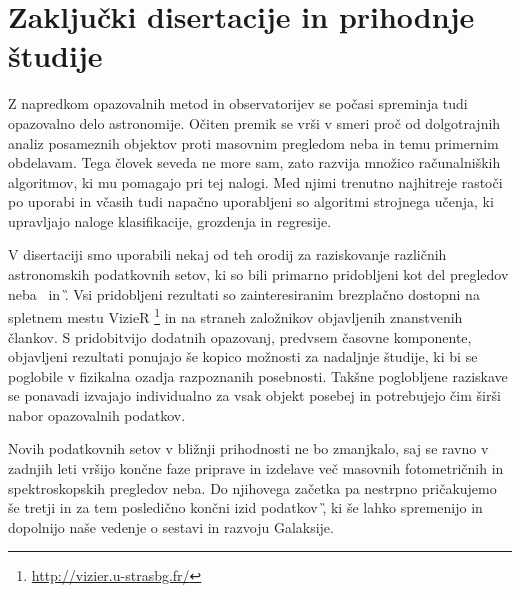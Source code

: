 \section{Zaključki disertacije in prihodnje študije}
\label{sec:slo_zakljucek}
Z napredkom opazovalnih metod in observatorijev se počasi spreminja tudi opazovalno delo astronomije. Očiten premik se vrši v smeri proč od dolgotrajnih analiz posameznih objektov proti masovnim pregledom neba in temu primernim obdelavam. Tega človek seveda ne more sam, zato razvija množico računalniških algoritmov, ki mu pomagajo pri tej nalogi. Med njimi trenutno najhitreje rastoči po uporabi in včasih tudi napačno uporabljeni so algoritmi strojnega učenja, ki upravljajo naloge klasifikacije, grozdenja in regresije.

V disertaciji smo uporabili nekaj od teh orodij za raziskovanje različnih astronomskih podatkovnih setov, ki so bili primarno pridobljeni kot del pregledov neba \Gh\ in \G. Vsi pridobljeni rezultati so zainteresiranim brezplačno dostopni na spletnem mestu VizieR \footnote{\url{http://vizier.u-strasbg.fr/}} in na straneh založnikov objavljenih znanstvenih člankov. S pridobitvijo dodatnih opazovanj, predvsem časovne komponente, objavljeni rezultati ponujajo še kopico možnosti za nadaljnje študije, ki bi se poglobile v fizikalna ozadja razpoznanih posebnosti. Takšne poglobljene raziskave se ponavadi izvajajo individualno za vsak objekt posebej in potrebujejo čim širši nabor opazovalnih podatkov.

Novih podatkovnih setov v bližnji prihodnosti ne bo zmanjkalo, saj se ravno v zadnjih leti vršijo končne faze priprave in izdelave več masovnih fotometričnih in spektroskopskih pregledov neba. Do njihovega začetka pa nestrpno pričakujemo še tretji in za tem posledično končni izid podatkov \G, ki še lahko spremenijo in dopolnijo naše vedenje o sestavi in razvoju Galaksije.